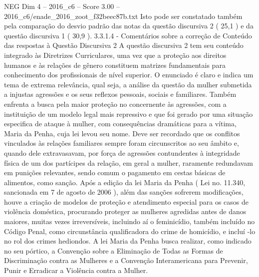 \begin{textsample}{NEG Dim 4 – 2016\_c6 – Score 3.00 – 2016\_c6/enade\_2016\_zoot\_f32beec87b.txt}
Isto pode ser constatado também pela comparação do desvio padrão das notas da questão discursiva 2 ( 25,1 ) e da questão discursiva 1 ( 30,9 ). 3.3.1.4 - Comentários sobre a correção de Conteúdo das respostas à Questão Discursiva 2 A questão discursiva 2 tem seu conteúdo integrado às Diretrizes Curriculares, uma vez que a proteção aos direitos humanos e às relações de gênero constituem matrizes fundamentais para conhecimento dos profissionais de nível superior.
O enunciado é claro e indica um tema de extrema relevância, qual seja, a análise da questão da mulher submetida a injustas agressões e os seus reflexos pessoais, sociais e familiares.
Também enfrenta a busca pela maior proteção no concernente às agressões, com a instituição de um modelo legal mais repressivo e que foi gerado por uma situação especifica de ataque à mulher, com consequências dramáticas para a vítima, Maria da Penha, cuja lei levou seu nome.
Deve ser recordado que os conflitos vinculados às relações familiares sempre foram circunscritos ao seu âmbito e, quando dele extravasavam, por força de agressões contundentes à integridade física de um dos partícipes da relação, em geral a mulher, raramente redundavam em punições relevantes, sendo comum o pagamento em cestas básicas de alimentos, como sanção.
Após a edição da lei Maria da Penha ( Lei no. 11.340, sancionada em 7 de agosto de 2006 ), além das sanções sofrerem modificações, houve a criação de modelos de proteção e atendimento especial para os casos de violência doméstica, procurando proteger as mulheres agredidas antes de danos maiores, muitas vezes irreversíveis, incluindo aí o feminicídio, também incluído no Código Penal, como circunstância qualificadora do crime de homicídio, e incluí -lo no rol dos crimes hediondos.
A lei Maria da Penha busca realizar, como indicado no seu pórtico, a Convenção sobre a Eliminação de Todas as Formas de Discriminação contra as Mulheres e a Convenção Interamericana para Prevenir, Punir e Erradicar a Violência contra a Mulher.

\end{textsample}
